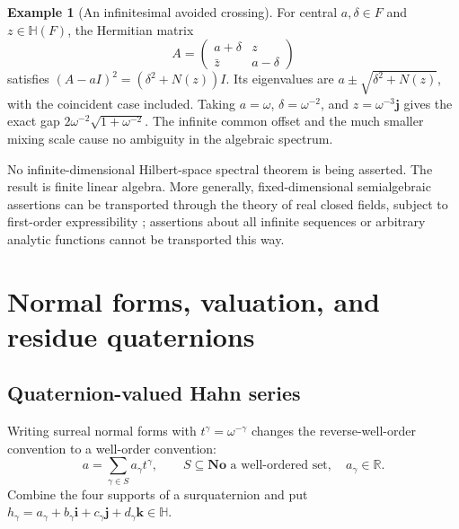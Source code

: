 \documentclass[11pt,letterpaper]{article}
\theoremstyle{definition}
\newtheorem{example}[theorem]{Example}
\newcommand{\No}{\mathbf{No}}
\newcommand{\R}{\mathbb R}
\newcommand{\HH}{\mathbb H}
\newcommand{\ii}{\mathbf i}
\newcommand{\jj}{\mathbf j}
\newcommand{\kk}{\mathbf k}
\begin{document}
\begin{example}[An infinitesimal avoided crossing]
For central $a,\delta\in F$ and $z\in\HH(F)$, the Hermitian matrix
\[
 A=\begin{pmatrix}a+\delta&z\\\bar z&a-\delta\end{pmatrix}
\]
satisfies $(A-aI)^2=(\delta^2+N(z))I$. Its eigenvalues are
$a\pm\sqrt{\delta^2+N(z)}$, with the coincident case included. Taking
$a=\omega$, $\delta=\omega^{-2}$, and $z=\omega^{-3}\jj$ gives the exact gap
$2\omega^{-2}\sqrt{1+\omega^{-2}}$. The infinite common offset and the much
smaller mixing scale cause no ambiguity in the algebraic spectrum.
\end{example}
No infinite-dimensional Hilbert-space spectral theorem is being asserted.
The result is finite linear algebra. More generally, fixed-dimensional
semialgebraic assertions can be transported through the theory of real closed
fields, subject to first-order expressibility \cite{swan}; assertions about all
infinite sequences or arbitrary analytic functions cannot be transported this
way.

\section{Normal forms, valuation, and residue quaternions}
\label{sec:valuation}
\subsection{Quaternion-valued Hahn series}
Writing surreal normal forms with $t^\gamma=\omega^{-\gamma}$ changes the
reverse-well-order convention to a well-order convention:
\[
 a=\sum_{\gamma\in S}a_\gamma t^\gamma,\qquad
 S\subseteq\No\text{ a well-ordered set},\quad a_\gamma\in\R.
\]
Combine the four supports of a surquaternion and put
$h_\gamma=a_\gamma+b_\gamma\ii+c_\gamma\jj+d_\gamma\kk\in\HH$.
\end{document}
